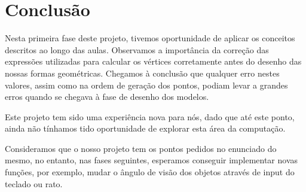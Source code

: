 \documentclass[12pt,a4paper]{report}%
\begin{document}
\begin{enumerate}
\end{enumerate}

\chapter{Conclusão} \label{chap:conclusao}

Nesta primeira fase deste projeto, tivemos oportunidade de aplicar os conceitos descritos ao longo das aulas. 
Observamos a importância da correção das expressões utilizadas para calcular os vértices corretamente antes do desenho das nossas formas geométricas. Chegamos à conclusão que qualquer erro nestes valores, assim como na ordem de geração dos pontos, podiam levar a grandes erros quando se chegava à fase de desenho dos modelos.

Este projeto tem sido uma experiência nova para nós, dado que até este ponto, ainda não tínhamos tido oportunidade de explorar esta área da computação.

Consideramos que o nosso projeto tem os pontos pedidos no enunciado do mesmo, no entanto, nas fases seguintes, esperamos conseguir implementar novas funções, por exemplo, mudar o ângulo de visão dos objetos através de input do teclado ou rato.
\end{document}
